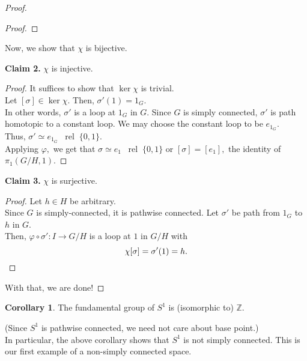\documentclass[12pt]{article}
\theoremstyle{definition}
\numberwithin{thm}{section}
\newtheorem{cor}[thm]{Corollary}
\newcommand{\rel}{\;\;\operatorname{rel}\;}
\newenvironment{blockquote}
{\begin{mdframed}[skipabove=0pt, skipbelow=0pt, innertopmargin=4pt, innerbottommargin=4pt, bottomline=false,topline=false,rightline=false, linewidth=2pt]}
{\end{mdframed}}
\begin{document}
\begin{proof}
\begin{blockquote}
\begin{proof}
		\end{proof}
	\end{blockquote}
	Now, we show that $\chi$ is bijective.
	\begin{blockquote}
		\textbf{Claim 2.} $\chi$ is injective.
		\begin{proof} 
			It suffices to show that $\ker \chi$ is trivial.\\
			Let $[\sigma] \in \ker\chi.$ Then, $\sigma'(1) = 1_G.$\\
			In other words, $\sigma'$ is a loop at $1_G$ in $G.$ Since $G$ is simply connected, $\sigma'$ is path homotopic to a constant loop. We may choose the constant loop to be $e_{1_G}.$\\
			Thus, $\sigma' \simeq e_{1_G} \rel \{0, 1\}.$\\
			Applying $\varphi,$ we get that $\sigma \simeq e_1 \rel \{0, 1\}$ or $[\sigma] = [e_1],$ the identity of $\pi_1(G/H, 1).$	
		\end{proof}
	\end{blockquote}
	\begin{blockquote}
		\textbf{Claim 3.} $\chi$ is surjective.	
		\begin{proof} 
			Let $h \in H$ be arbitrary.\\
			Since $G$ is simply-connected, it is pathwise connected. Let $\sigma'$ be path from $1_G$ to $h$ in $G.$\\
			Then, $\varphi\circ\sigma':I\to G/H$ is a loop at $1$ in $G/H$ with
			\begin{equation*} 
				\chi[\sigma] = \sigma'(1) = h. \qedhere
			\end{equation*}
		\end{proof}
	\end{blockquote}
	With that, we are done!
\end{proof}
\begin{cor}
	The fundamental group of $S^1$ is (isomorphic to) $\mathbb{Z}.$
\end{cor}
(Since $S^1$ is pathwise connected, we need not care about base point.)\\
In particular, the above corollary shows that $S^1$ is not simply connected. This is our first example of a non-simply connected space.
\end{document}
